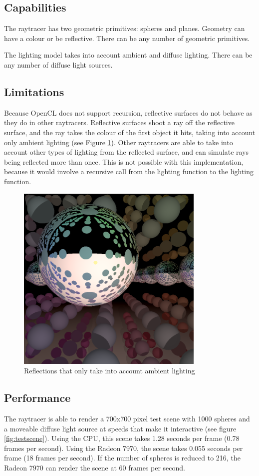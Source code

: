 \documentclass{article}
\begin{document}
\subsection{Capabilities}
The raytracer has two geometric primitives: spheres and planes. Geometry can have a colour or be reflective. There can be any number of geometric primitives.

The lighting model takes into account ambient and diffuse lighting. There can be any number of diffuse light sources.

\subsection{Limitations}
Because OpenCL does not support recursion, reflective surfaces do not behave as they do in other raytracers. Reflective surfaces shoot a ray off the reflective surface, and the ray takes the colour of the first object it hits, taking into account only ambient lighting (see Figure \ref{fig:reflections}). Other raytracers are able to take into account other types of lighting from the reflected surface, and can simulate rays being reflected more than once. This is not possible with this implementation, because it would involve a recursive call from the lighting function to the lighting function.

\begin{figure}[ht!]
\centering
\includegraphics[width=90mm]{reflections.png}
\caption{Reflections that only take into account ambient lighting}
\label{fig:reflections}
\end{figure}

\subsection{Performance}
The raytracer is able to render a 700x700 pixel test scene with 1000 spheres and a moveable diffuse light source at speeds that make it interactive (see figure \ref{fig:testscene}). Using the CPU, this scene takes 1.28 seconds per frame (0.78 frames per second). Using the Radeon 7970, the scene takes 0.055 seconds per frame (18 frames per second). If the number of spheres is reduced to 216, the Radeon 7970 can render the scene at 60 frames per second.
\end{document}
